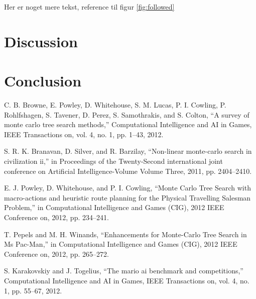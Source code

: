 \documentclass[10pt,a4paper]{article}
\begin{document}
Her er noget mere tekst, reference til figur \ref{fig:followed}
\clearpage
\section{Discussion}
\section{Conclusion}
\clearpage

\begin{thebibliography}{9} %
  C. B. Browne, E. Powley, D. Whitehouse, S. M. Lucas, P. I. Cowling, P. Rohlfshagen, S. Tavener, D. Perez, S. Samothrakis, and S. Colton, “A survey of monte carlo tree search methods,” Computational Intelligence and AI in Games, IEEE Transactions on, vol. 4, no. 1, pp. 1–43, 2012.

S. R. K. Branavan, D. Silver, and R. Barzilay, “Non-linear monte-carlo search in civilization ii,” in Proceedings of the Twenty-Second international joint conference on Artificial Intelligence-Volume Volume Three, 2011, pp. 2404–2410.

E. J. Powley, D. Whitehouse, and P. I. Cowling, “Monte Carlo Tree Search with macro-actions and heuristic route planning for the Physical Travelling Salesman Problem,” in Computational Intelligence and Games (CIG), 2012 IEEE Conference on, 2012, pp. 234–241.

T. Pepels and M. H. Winands, “Enhancements for Monte-Carlo Tree Search in Ms Pac-Man,” in Computational Intelligence and Games (CIG), 2012 IEEE Conference on, 2012, pp. 265–272.

S. Karakovskiy and J. Togelius, “The mario ai benchmark and competitions,” Computational Intelligence and AI in Games, IEEE Transactions on, vol. 4, no. 1, pp. 55–67, 2012.

\end{thebibliography}
\end{document}
